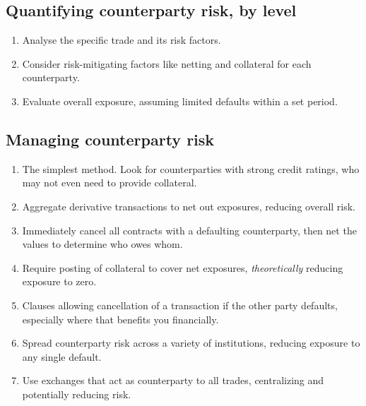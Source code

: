 \subsection*{Quantifying counterparty risk, by level}

\begin{enumerate}[label=\alph*)]
\item {} Analyse the specific trade and its risk factors.
\item {} Consider risk-mitigating factors like netting and
collateral for each counterparty.
\item {} Evaluate overall exposure, assuming limited defaults
within a set period.
\end{enumerate}


\subsection*{Managing counterparty risk}

\begin{enumerate}[label=\alph*)]
\item {} The simplest method. Look for
counterparties with strong credit ratings, who may not even need to provide
collateral.
\item {} Aggregate derivative transactions to net out
exposures, reducing overall risk.
\item {} Immediately cancel all contracts with a defaulting
counterparty, then net the values to determine who owes whom.
\item {} Require posting of collateral to cover net
exposures, \emph{theoretically} reducing exposure to zero.
\item {} Clauses allowing cancellation of a transaction if
the other party defaults, especially where that benefits you financially.
\item {} Spread counterparty risk across a variety of
institutions, reducing exposure to any single default.
\item {} Use exchanges that act as counterparty to
all trades, centralizing and potentially reducing risk.
\end{enumerate}

